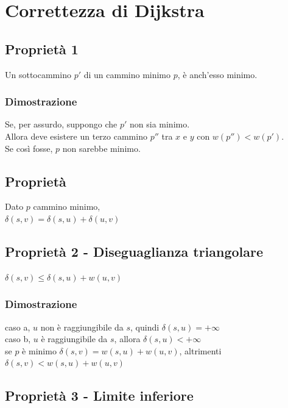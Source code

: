 \documentclass[11pt,a4paper,twoside,openright]{book}
\begin{document}
{{\section{Correttezza di Dijkstra}

\subsection{Proprietà 1}

Un sottocammino $p'$ di un cammino minimo $p$, è anch'esso minimo.

\subsubsection{Dimostrazione}

Se, per assurdo, suppongo che $p'$ non sia minimo.\\
Allora deve esistere un terzo cammino $p''$ tra $x$ e $y$ con $w(p'') < w(p')$.\\
Se così fosse, $p$ non sarebbe minimo.

\subsection{Proprietà}

Dato $p$ cammino minimo, \\
$\delta(s,v)=\delta(s,u)+\delta(u,v)$ \\


\subsection{Proprietà 2 - Diseguaglianza triangolare}

$\delta(s,v)\leq \delta(s,u)+w(u,v)$ \\

\subsubsection{Dimostrazione}

caso a, $u$ non è raggiungibile da $s$, quindi $\delta(s,u) = +\infty$ \\
caso b, $u$ è raggiungibile da $s$, allora $\delta(s,u) < +\infty$ \\

se $p$ è minimo $\delta(s,v)=w(s,u)+w(u,v)$, altrimenti $\delta(s,v)<w(s,u)+w(u,v)$ \\


\subsection{Proprietà 3 - Limite inferiore}

}}
\end{document}
